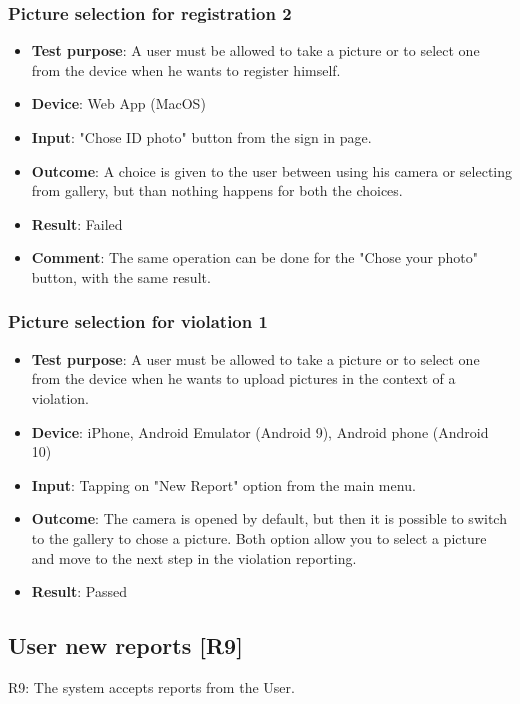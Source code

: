 \documentclass[../ATD.tex]{subfiles}
\begin{document}
    \subsubsection{Picture selection for registration 2}\label{subsubsec:picture-selection-for-registration-2}
    \begin{itemize}
        \item \textbf{Test purpose}: A user must be allowed to take a picture or to select one from the device when he wants to register himself.
        \item \textbf{Device}: Web App (MacOS)
        \item \textbf{Input}: "Chose ID photo" button from the sign in page.
        \item \textbf{Outcome}: A choice is given to the user between using his camera or selecting from gallery, but than nothing happens for both the choices.
        \item \textbf{Result}: Failed
        \item \textbf{Comment}: The same operation can be done for the "Chose your photo" button, with the same result.
    \end{itemize}

    \subsubsection{Picture selection for violation 1}\label{subsubsec:picture-selection-for-violation-1}
    \begin{itemize}
        \item \textbf{Test purpose}: A user must be allowed to take a picture or to select one from the device when he wants to upload pictures in the context of a violation.
        \item \textbf{Device}: iPhone, Android Emulator (Android 9), Android phone (Android 10)
        \item \textbf{Input}: Tapping on "New Report" option from the main menu.
        \item \textbf{Outcome}: The camera is opened by default, but then it is possible to switch to the gallery to chose a picture.
        Both option allow you to select a picture and move to the next step in the violation reporting.
        \item \textbf{Result}: Passed
    \end{itemize}

    \subsection{User new reports [R9]}\label{subsec:user-new-report}
    R9: The system accepts reports from the User.
\end{document}
